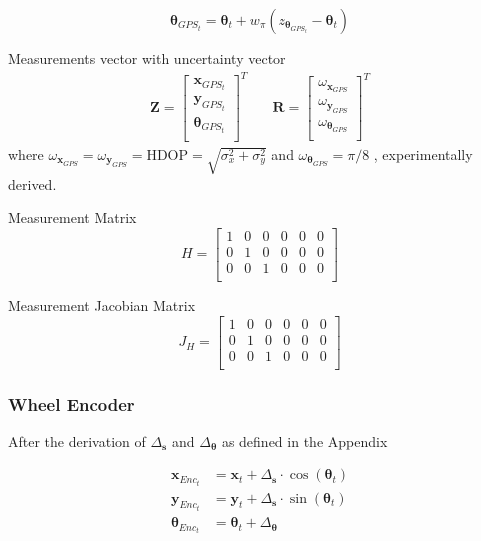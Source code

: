 $$
\boldsymbol \theta_{GPS_t} = \boldsymbol \theta_{t} + w_{\pi}(z_{\boldsymbol \theta_{GPS_t}} - \boldsymbol \theta_{t})
$$

Measurements vector with uncertainty vector
\begin{align}
\mathbf{Z}
=
\begin{bmatrix}
\mathbf{x}_{GPS_t} \\
\mathbf{y}_{GPS_t} \\
\boldsymbol \theta_{GPS_t} \\
\end{bmatrix}^T
& \quad
\mathbf{R}
=
\begin{bmatrix}
\omega_{\mathbf{x}_{GPS}} \\
\omega_{\mathbf{y}_{GPS}} \\
\omega_{\boldsymbol \theta_{GPS}} \\
\end{bmatrix}^T
\end{align}
where $ \omega_{\mathbf{x}_{GPS}} = \omega_{\mathbf{y}_{GPS}} = \text{HDOP} = \sqrt{\sigma_x^2 + \sigma_y^2}$ and
$ \omega_{\boldsymbol \theta_{GPS}} = \pi/8 $ , experimentally derived.

Measurement Matrix
\begin{equation}
H
=
\begin{bmatrix}
1 & 0 & 0 & 0 & 0 & 0 \\
0 & 1 & 0 & 0 & 0 & 0 \\
0 & 0 & 1 & 0 & 0 & 0 \\
\end{bmatrix}
\end{equation}

Measurement Jacobian Matrix
\begin{equation}
J_H
=
\begin{bmatrix}
1 & 0 & 0 & 0 & 0 & 0 \\
0 & 1 & 0 & 0 & 0 & 0 \\
0 & 0 & 1 & 0 & 0 & 0 \\
\end{bmatrix}
\end{equation}

\subsubsection{Wheel Encoder}

After the derivation of $\Delta_{\textbf{s}}$ and $\Delta_{\boldsymbol \theta}$ as defined in the Appendix

\begin{align}
\mathbf{x}_{Enc_t} & = \mathbf{x}_{t} + \Delta_{\textbf{s}} \cdot \cos(\boldsymbol \theta_{t}) \\
\mathbf{y}_{Enc_t} & = \mathbf{y}_{t} + \Delta_{\textbf{s}} \cdot \sin(\boldsymbol \theta_{t}) \\
\boldsymbol \theta_{Enc_t} & = \boldsymbol \theta_{t} + \Delta_{\boldsymbol \theta}
\end{align}


